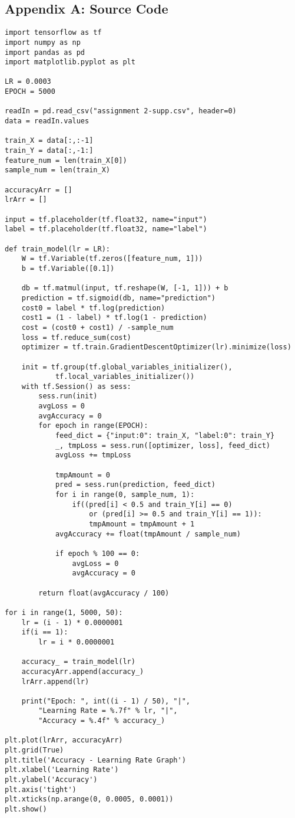 \documentclass{article}
\begin{document}
\newpage
\begin{appendix}
\section{Appendix A: Source Code}
\begin{lstlisting}
import tensorflow as tf 
import numpy as np 
import pandas as pd 
import matplotlib.pyplot as plt 

LR = 0.0003 
EPOCH = 5000 

readIn = pd.read_csv("assignment 2-supp.csv", header=0) 
data = readIn.values 

train_X = data[:,:-1] 
train_Y = data[:,-1:] 
feature_num = len(train_X[0]) 
sample_num = len(train_X) 

accuracyArr = [] 
lrArr = [] 

input = tf.placeholder(tf.float32, name="input")
label = tf.placeholder(tf.float32, name="label")

def train_model(lr = LR):
    W = tf.Variable(tf.zeros([feature_num, 1]))
    b = tf.Variable([0.1]) 

    db = tf.matmul(input, tf.reshape(W, [-1, 1])) + b 
    prediction = tf.sigmoid(db, name="prediction") 
    cost0 = label * tf.log(prediction)
    cost1 = (1 - label) * tf.log(1 - prediction)
    cost = (cost0 + cost1) / -sample_num
    loss = tf.reduce_sum(cost) 
    optimizer = tf.train.GradientDescentOptimizer(lr).minimize(loss)

    init = tf.group(tf.global_variables_initializer(),
            tf.local_variables_initializer())
    with tf.Session() as sess:
        sess.run(init)
        avgLoss = 0
        avgAccuracy = 0
        for epoch in range(EPOCH):
            feed_dict = {"input:0": train_X, "label:0": train_Y}
            _, tmpLoss = sess.run([optimizer, loss], feed_dict)
            avgLoss += tmpLoss

            tmpAmount = 0
            pred = sess.run(prediction, feed_dict)
            for i in range(0, sample_num, 1):
                if((pred[i] < 0.5 and train_Y[i] == 0) 
                    or (pred[i] >= 0.5 and train_Y[i] == 1)):
                    tmpAmount = tmpAmount + 1
            avgAccuracy += float(tmpAmount / sample_num)

            if epoch % 100 == 0:
                avgLoss = 0
                avgAccuracy = 0

        return float(avgAccuracy / 100)

for i in range(1, 5000, 50):
    lr = (i - 1) * 0.0000001
    if(i == 1):
        lr = i * 0.0000001  

    accuracy_ = train_model(lr)
    accuracyArr.append(accuracy_)  
    lrArr.append(lr) 

    print("Epoch: ", int((i - 1) / 50), "|", 
        "Learning Rate = %.7f" % lr, "|", 
        "Accuracy = %.4f" % accuracy_)

plt.plot(lrArr, accuracyArr)
plt.grid(True) 
plt.title('Accuracy - Learning Rate Graph')
plt.xlabel('Learning Rate')
plt.ylabel('Accuracy') 
plt.axis('tight') 
plt.xticks(np.arange(0, 0.0005, 0.0001)) 
plt.show()


\end{lstlisting}
  \end{appendix}
\end{document}
